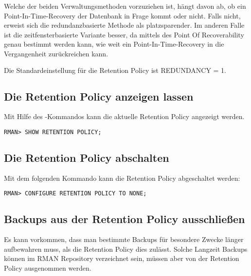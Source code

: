         Welche der beiden Verwaltungsmethoden vorzuziehen ist, h\"angt davon ab, ob ein Point-In-Time-Recovery der Datenbank in Frage kommt oder nicht. Falls nicht, erweist sich die redundanzbasierte Methode als platzsparender. Im anderen Falle ist die zeitfensterbasierte Variante besser, da mittels des Point Of Recoverability genau bestimmt werden kann, wie weit ein Point-In-Time-Recovery in die Vergangenheit zur\"uckreichen kann.
        \begin{merke}
          Die Standardeinstellung f\"ur die Retention Policy ist REDUNDANCY = 1.
        \end{merke}
\clearpage
			\subsection{Die Retention Policy anzeigen lassen}
        Mit Hilfe des -Kommandos kann die aktuelle Retention Policy angezeigt werden.
        \begin{lstlisting}[caption={Anzeigen der Retention Policy},label=admin1027,language=rman]
RMAN> SHOW RETENTION POLICY;
        \end{lstlisting}
      \subsection{Die Retention Policy abschalten}
        Mit dem folgenden Kommando kann die Retention Policy abgeschaltet werden:
        \begin{lstlisting}[caption={Abschalten der Retention Policy},label=admin1028,language=rman]
RMAN> CONFIGURE RETENTION POLICY TO NONE;
        \end{lstlisting}
      \subsection{Backups aus der Retention Policy ausschlie\ss{}en}
        Es kann vorkommen, dass man bestimmte Backups f\"ur besondere Zwecke l\"anger aufbewahren muss, als die Retention Policy dies zul\"asst. Solche Langzeit Backups k\"onnen im RMAN Repository verzeichnet sein, m\"ussen aber von der Retention Policy ausgenommen werden.

